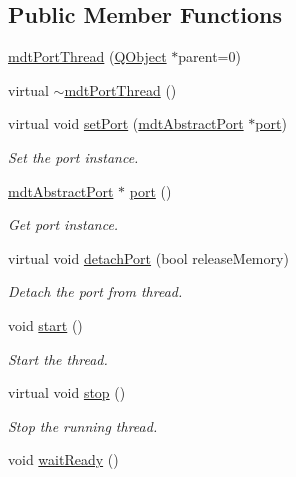 \subsection*{Public Member Functions}
\begin{DoxyCompactItemize}
\item 
\hyperlink{classmdt_port_thread_aa20869c68d7a016f9e547464f0d8b71e}{mdt\-Port\-Thread} (\hyperlink{class_q_object}{Q\-Object} $\ast$parent=0)
\item 
virtual \hyperlink{classmdt_port_thread_a554615870b4c3b18af73d2ab7262800d}{$\sim$mdt\-Port\-Thread} ()
\item 
virtual void \hyperlink{classmdt_port_thread_acd51474c3a2683676423317bc9cb31b2}{set\-Port} (\hyperlink{classmdt_abstract_port}{mdt\-Abstract\-Port} $\ast$\hyperlink{classmdt_port_thread_a97bff8cf6aca37d8858cc4e5c9294cae}{port})
\begin{DoxyCompactList}\small\item\em Set the port instance. \end{DoxyCompactList}\item 
\hyperlink{classmdt_abstract_port}{mdt\-Abstract\-Port} $\ast$ \hyperlink{classmdt_port_thread_a97bff8cf6aca37d8858cc4e5c9294cae}{port} ()
\begin{DoxyCompactList}\small\item\em Get port instance. \end{DoxyCompactList}\item 
virtual void \hyperlink{classmdt_port_thread_a29b434534a5564efbd9dfe570a61b143}{detach\-Port} (bool release\-Memory)
\begin{DoxyCompactList}\small\item\em Detach the port from thread. \end{DoxyCompactList}\item 
void \hyperlink{classmdt_port_thread_a5a5c1290eaa43182d69c3f39eadbec00}{start} ()
\begin{DoxyCompactList}\small\item\em Start the thread. \end{DoxyCompactList}\item 
virtual void \hyperlink{classmdt_port_thread_a5746ea96689ed80179751ad1353f0b39}{stop} ()
\begin{DoxyCompactList}\small\item\em Stop the running thread. \end{DoxyCompactList}\item 
void \hyperlink{classmdt_port_thread_aca7473f73c6b68fe8c3e1cfc349240e7}{wait\-Ready} ()

\end{DoxyCompactItemize}

